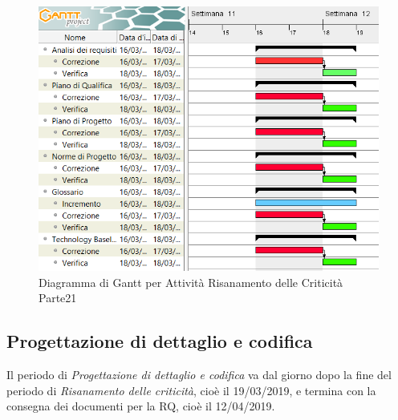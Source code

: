\begin{figure}[h]
	\centering
  		\includegraphics[width=1.0\linewidth]{./images/RisanamentoCriticita2.png}
  		\caption{Diagramma di Gantt per Attività Risanamento delle Criticità Parte21}
  		\label{fig:Gantt Risananmento Criticità 2}
\end{figure}

\newpage
\subsection{Progettazione di dettaglio e codifica}
Il periodo di \textit{Progettazione di dettaglio e codifica} va dal giorno dopo la fine del periodo di \textit{Risanamento delle criticità}, cioè il 19/03/2019, e termina con la consegna dei documenti per la RQ, cioè il 12/04/2019.\\

